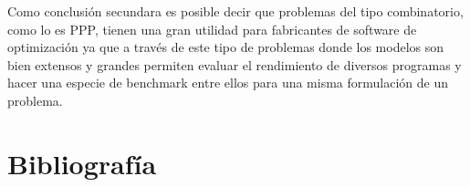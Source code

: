 \documentclass[letter, 10pt]{article}
\begin{document}
Como conclusión secundara es posible decir que problemas del tipo combinatorio, como lo es PPP, tienen una gran utilidad para fabricantes de software de optimización ya que a través de este tipo de problemas donde los modelos son bien extensos y grandes permiten evaluar el rendimiento de diversos programas y hacer una especie de benchmark entre ellos para una misma formulación de un problema.



\section{Bibliografía}


\end{document}
